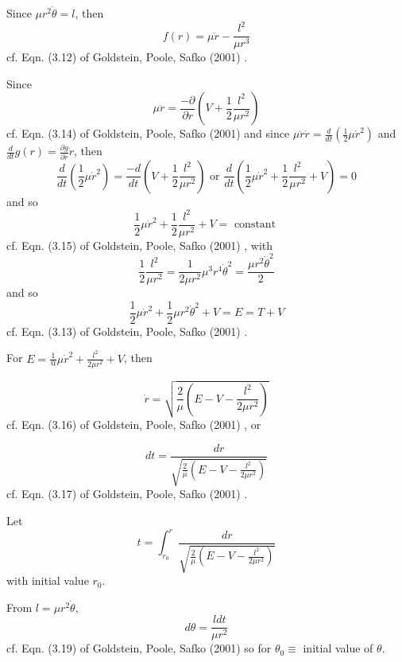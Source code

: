 \documentclass[10pt]{amsart}
\begin{document}
\begin{multicols*}{2}
Since $\mu r^2 \dot{\theta} = l$, then
\begin{equation}
f(r) = \mu \ddot{r} - \frac{l^2}{\mu r^3}
\end{equation}
cf. Eqn. (3.12) of Goldstein, Poole, Safko (2001) \cite{GPS2001}.

Since 
\begin{equation}
\mu \ddot{r} = \frac{- \partial}{\partial r} \left( V + \frac{1}{2} \frac{l^2 }{\mu r^2} \right)
\end{equation}
cf. Eqn. (3.14) of Goldstein, Poole, Safko (2001) \cite{GPS2001} and since $\mu \ddot{r} \dot{r} = \frac{d}{dt} \left( \frac{1}{2} \mu \dot{r}^2 \right)$ and $\frac{d}{dt} g(r) = \frac{\partial g}{\partial r} \dot{r}$, then
\[
\frac{d}{dt} \left( \frac{1}{2} \mu \dot{r}^2 \right) = \frac{-d}{dt} \left( V + \frac{1}{2} \frac{l^2 }{ \mu r^2 } \right) \text{ or } \frac{d}{dt} \left( \frac{1}{2} \mu \dot{r}^2 + \frac{1}{2} \frac{l^2}{ \mu r^2 } + V \right) = 0
\]
and so
\begin{equation}
\frac{1}{2} \mu \dot{r}^2 + \frac{1}{2} \frac{l^2}{ \mu r^2} + V = \text{ constant } 
\end{equation}
cf. Eqn. (3.15) of  Goldstein, Poole, Safko (2001) \cite{GPS2001}, with
\[
\frac{1}{2} \frac{l^2 }{\mu r^2 } = \frac{1}{2 \mu r^2} \mu^3 r^4 \dot{\theta}^2 = \frac{\mu r^2 \dot{\theta}^2 }{2} 
\]
and so
\begin{equation}
\frac{1}{2} \mu \dot{r}^2 + \frac{1}{2} \mu r^2 \dot{\theta}^2 + V = E = T+V 
\end{equation}
cf. Eqn. (3.13) of  Goldstein, Poole, Safko (2001) \cite{GPS2001}.

For $E = \frac{1}{@} \mu \dot{r}^2 + \frac{l^2}{2\mu r^2 } + V$, then 

\begin{equation}
\dot{r} = \sqrt{ \frac{2}{\mu} \left( E - V - \frac{l^2}{2 \mu r^2}  \right)  }
\end{equation}
cf. Eqn. (3.16)  of Goldstein, Poole, Safko (2001) \cite{GPS2001}, or 

\begin{equation}
dt =\frac{dr}{ \sqrt{ \frac{2}{\mu} \left( E - V - \frac{l^2}{2 \mu r^2 } \right) } }
\end{equation}
cf. Eqn. (3.17) of  Goldstein, Poole, Safko (2001) \cite{GPS2001}.

Let
\[
t =\int_{r_0}^r \frac{dr}{ \sqrt{ \frac{2}{\mu} \left( E - V - \frac{l^2}{2 \mu r^2 } \right) } }
\]
with initial value $r_0$.

From $l= \mu r^2 \dot{\theta}$,
\begin{equation}
d\theta = \frac{l dt}{\mu r^2} 
\end{equation}
cf. Eqn. (3.19) of Goldstein, Poole, Safko (2001) \cite{GPS2001} so for $\theta_0 \equiv $ initial value of $\theta$.


\end{multicols*}
\end{document}
